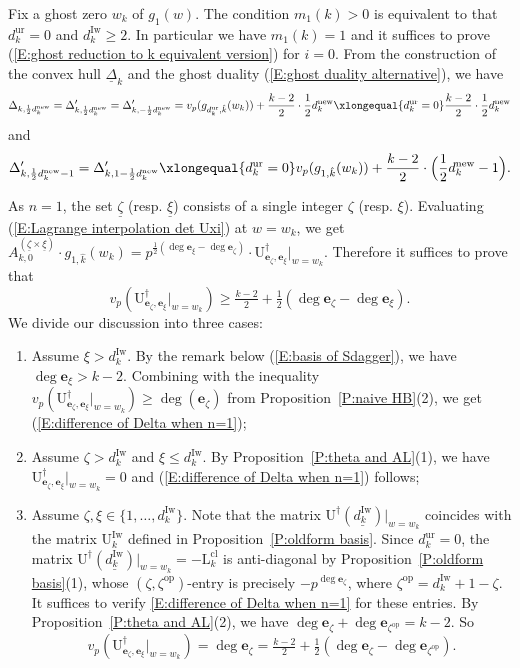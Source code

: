 \documentclass[12pt]{amsart}
\theoremstyle{definition}
\numberwithin{equation}{subsection}
\def\bfe{\mathbf{e}}
\def\rmL{\mathrm{L}}
\def\rmU{\mathrm{U}}
\newcommand{\op}{\mathrm{op}}
\newcommand{\new}{\mathrm{new}}
\newcommand{\Iw}{\mathrm{Iw}}
\newcommand{\cl}{\mathrm{cl}}
\newcommand{\ur}{\mathrm{ur}}
\begin{document}
Fix a ghost zero $w_k$ of $g_1(w)$. The condition $m_1(k)>0$ is equivalent to that $d_k^\ur = 0$ and $d_k^\Iw \geq 2$. In particular we have $m_1(k) =1$ and it suffices to prove (\ref{E:ghost reduction to k equivalent version}) for $i=0$.  From the construction of the convex hull $\underline\Delta_k$ and the ghost duality (\ref{E:ghost duality alternative}), we have 
\[
\Delta_{k, \frac 12d_k^\new}=\Delta'_{k, \frac 12d_k^\new}=\Delta'_{k, -\frac 12d_k^\new}=v_p(g_{d_k^\ur,\hat{ k}}(w_k))+\frac{k-2}2\cdot \frac 12 d_k^\new\xlongequal{d_k^\ur=0}\frac{k-2}2\cdot \frac 12 d_k^\new
\]
and
\[
\Delta'_{k, \frac 12d_k^\new-1}=\Delta'_{k, 1-\frac 12d_k^\new}\xlongequal{d_k^\ur=0}v_p(g_{1,\hat{ k}}(w_k))+\frac{k-2}2\cdot\Big(\frac 12 d_k^\new-1\Big).
\]

As $n=1$, the set $\underline\zeta$ (resp. $\underline\xi$) consists of a single integer $\zeta$ (resp. $\xi$). Evaluating (\ref{E:Lagrange interpolation det Uxi}) at $w=w_k$, we get $A_{k,0}^{(\underline\zeta\times \underline\xi)}\cdot g_{1,\hat{ k}}(w_k) = p^{\frac 12 (\deg \bfe_\xi-\deg \bfe_\zeta)}\cdot \rmU^\dagger_{\bfe_\zeta, \bfe_\xi}|_{w=w_k}$. 
Therefore it suffices to prove that 
\begin{equation}
\label{E:difference of Delta when n=1}
v_p(\rmU^\dagger_{\bfe_\zeta, \bfe_\xi}|_{w=w_k}) \geq \tfrac{k-2}2 +\tfrac 12( \deg \bfe_\zeta-\deg \bfe_\xi).
\end{equation}
We divide our discussion into three cases:
\begin{enumerate}
\item Assume $\xi>d_k^\Iw$. By the remark below (\ref{E:basis of Sdagger}), we have $\deg \bfe_\xi>k-2$. Combining with the inequality $v_p(\rmU^\dagger_{\bfe_\zeta, \bfe_\xi}|_{w=w_k}) \geq \deg(\bfe_\zeta)$ from Proposition~\ref{P:naive HB}(2), we get (\ref{E:difference of Delta when n=1});
	\item Assume $\zeta>d_k^\Iw$ and $\xi\leq d_k^\Iw$. By Proposition~\ref{P:theta and AL}(1), we have $\rmU^\dagger_{\bfe_\zeta, \bfe_\xi}|_{w=w_k}=0$ and (\ref{E:difference of Delta when n=1}) follows;
\item Assume $\zeta, \xi \in \{1, \dots, d_k^\Iw\}$. Note that the matrix $\rmU^\dagger(\underline{d_k^\Iw})|_{w=w_k}$ coincides with the matrix $\rmU_k^\Iw$ defined in Proposition~\ref{P:oldform basis}. Since $d_k^\ur=0$, the matrix $\rmU^\dagger(\underline{d_k^\Iw})|_{w=w_k}=-\rmL_k^\cl$ is anti-diagonal by Proposition~\ref{P:oldform basis}(1), whose $(\zeta, \zeta^{\op})$-entry is precisely $-p^{\deg \bfe_{\zeta}}$, where $\zeta^{\op} =d_k^\Iw+1-\zeta$. It suffices to verify \eqref{E:difference of Delta when n=1} for these entries. By Proposition~\ref{P:theta and AL}(2),  we have $\deg\bfe_\zeta+\deg\bfe_{\zeta^\op}=k-2$. So	\[
v_p(\rmU^\dagger_{\bfe_\zeta, \bfe_\xi}|_{w=w_k})=\deg\bfe_\zeta=\tfrac{k-2}2+\tfrac 12 (\deg\bfe_\zeta-\deg\bfe_{\zeta^\op}).
	\]
\end{enumerate}
\end{document}

